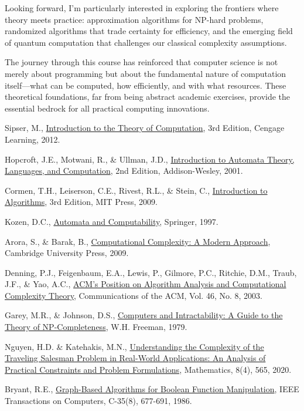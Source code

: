 \documentclass{article}
\theoremstyle{theorem}
\theoremstyle{definition}
\theoremstyle{remark}
\begin{document}
Looking forward, I'm particularly interested in exploring the frontiers where theory meets practice: approximation algorithms for NP-hard problems, randomized algorithms that trade certainty for efficiency, and the emerging field of quantum computation that challenges our classical complexity assumptions.

The journey through this course has reinforced that computer science is not merely about programming but about the fundamental nature of computation itself—what can be computed, how efficiently, and with what resources. These theoretical foundations, far from being abstract academic exercises, provide the essential bedrock for all practical computing innovations.

\begin{thebibliography}{99}
 Sipser, M., \href{https://www.cengage.com/c/introduction-to-the-theory-of-computation-3e-sipser/9781133187790/}{Introduction to the Theory of Computation}, 3rd Edition, Cengage Learning, 2012.

 Hopcroft, J.E., Motwani, R., \& Ullman, J.D., \href{https://www.pearson.com/en-us/subject-catalog/p/introduction-to-automata-theory-languages-and-computation/P200000003505/9780201441246}{Introduction to Automata Theory, Languages, and Computation}, 2nd Edition, Addison-Wesley, 2001.

 Cormen, T.H., Leiserson, C.E., Rivest, R.L., \& Stein, C., \href{https://mitpress.mit.edu/books/introduction-algorithms-third-edition}{Introduction to Algorithms}, 3rd Edition, MIT Press, 2009.

 Kozen, D.C., \href{https://link.springer.com/book/10.1007/978-1-4612-1844-9}{Automata and Computability}, Springer, 1997.

 Arora, S., \& Barak, B., \href{https://theory.cs.princeton.edu/complexity/}{Computational Complexity: A Modern Approach}, Cambridge University Press, 2009.

 Denning, P.J., Feigenbaum, E.A., Lewis, P., Gilmore, P.C., Ritchie, D.M., Traub, J.F., \& Yao, A.C., \href{https://dl.acm.org/doi/10.1145/944234.944235}{ACM's Position on Algorithm Analysis and Computational Complexity Theory}, Communications of the ACM, Vol. 46, No. 8, 2003.

 Garey, M.R., \& Johnson, D.S., \href{https://dl.acm.org/doi/book/10.5555/578533}{Computers and Intractability: A Guide to the Theory of NP-Completeness}, W.H. Freeman, 1979.

 Nguyen, H.D. \& Katehakis, M.N., \href{https://www.mdpi.com/2227-7390/8/4/565}{Understanding the Complexity of the Traveling Salesman Problem in Real-World Applications: An Analysis of Practical Constraints and Problem Formulations}, Mathematics, 8(4), 565, 2020.

 Bryant, R.E., \href{https://ieeexplore.ieee.org/document/1676819}{Graph-Based Algorithms for Boolean Function Manipulation}, IEEE Transactions on Computers, C-35(8), 677-691, 1986.
\end{thebibliography}
\end{document}
